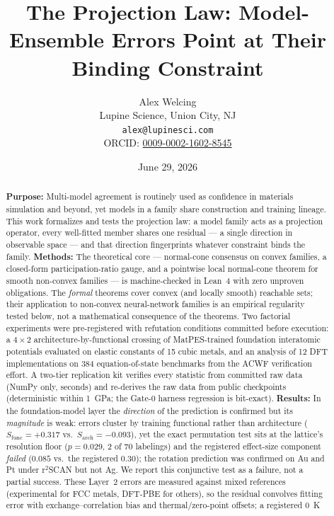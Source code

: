 \documentclass[11pt]{article}
\title{\bfseries The Projection Law: Model-Ensemble Errors Point at Their Binding Constraint}
\author{Alex Welcing\\ \small Lupine Science, Union City, NJ\\ \small \texttt{alex@lupinesci.com}\\ \small ORCID: \href{https://orcid.org/0009-0002-1602-8545}{0009-0002-1602-8545}}
\date{June 29, 2026}
\theoremstyle{remark}
\begin{document}
\maketitle

\begin{abstract}
\noindent\textbf{Purpose:} Multi-model agreement is routinely used as
confidence in materials simulation and beyond, yet models in a family share
construction and training lineage. This work formalizes and tests the
projection law: a model family acts as a projection operator, every
well-fitted member shares one residual --- a single direction in observable
space --- and that direction fingerprints whatever constraint binds the
family.
\textbf{Methods:} The theoretical core --- normal-cone consensus on convex
families, a closed-form participation-ratio gauge, and a pointwise local
normal-cone theorem for smooth non-convex families --- is machine-checked in
Lean~4 with zero unproven obligations. The
\emph{formal} theorems cover convex (and locally smooth) reachable sets; their
application to non-convex neural-network families is an empirical regularity
tested below, not a mathematical consequence of the theorems. Two factorial
experiments were pre-registered with refutation conditions committed before
execution: a $4{\times}2$ architecture-by-functional crossing of MatPES-trained
foundation interatomic potentials evaluated on elastic constants of 15 cubic
metals, and an analysis of 12 DFT implementations on 384 equation-of-state
benchmarks from the ACWF verification effort. A two-tier replication kit
verifies every statistic from committed raw data (NumPy only, seconds) and
re-derives the raw data from public checkpoints (deterministic within 1~GPa;
the Gate-0 harness regression is bit-exact).
\textbf{Results:} In the foundation-model layer the \emph{direction} of the
prediction is confirmed but its \emph{magnitude} is weak: errors cluster by
training functional rather than architecture ($S_{\mathrm{func}}{=}{+}0.317$
vs.\ $S_{\mathrm{arch}}{=}{-}0.093$), yet the exact permutation test sits at the
lattice's resolution floor ($p{=}0.029$, 2 of 70 labelings) and the registered
effect-size component \emph{failed} ($0.085$ vs.\ the registered $0.30$); the
rotation prediction was confirmed on Au and Pt under r$^2$SCAN but not Ag. We
report this conjunctive test as a failure, not a partial success. These Layer~2
errors are measured against mixed references (experimental for FCC metals,
DFT-PBE for others), so the residual convolves fitting error with
exchange--correlation bias and thermal/zero-point offsets; a registered 0~K

\end{abstract}
\end{document}

